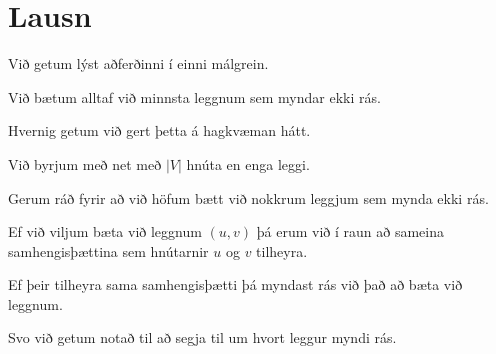 \section{Lausn}
{
    {
        \item<1-> Við getum lýst aðferðinni í einni málgrein.
        \item<2-> Við bætum alltaf við minnsta leggnum sem myndar ekki rás.
        \item<3-> Hvernig getum við gert þetta á hagkvæman hátt.
        \item<4-> Við byrjum með net með $|V|$ hnúta en enga leggi.
        \item<5-> Gerum ráð fyrir að við höfum bætt við nokkrum leggjum sem mynda ekki rás.
        \item<6-> Ef við viljum bæta við leggnum $(u, v)$ þá erum við í raun að sameina samhengisþættina sem hnútarnir $u$ og $v$ tilheyra.
        \item<7-> Ef þeir tilheyra sama samhengisþætti þá myndast rás við það að bæta við leggnum.
        \item<8-> Svo við getum notað  til að segja til um hvort leggur myndi rás.
    }
}


